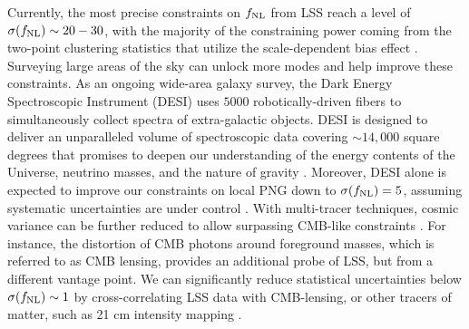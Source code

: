 Currently, the most precise constraints on $f_{\rm NL}$ from LSS reach a level of $\sigma(f_{\rm NL}) \sim 20-30$, with the majority of the constraining power coming from the two-point clustering statistics that utilize the scale-dependent bias effect \citep{2019JCAP...09..010C, mueller2022primordial, 2022PhRvD.106d3506C, 2022arXiv220111518D}. Surveying large areas of the sky can unlock more modes and help improve these constraints. As an ongoing wide-area galaxy survey, the Dark Energy Spectroscopic Instrument (DESI) uses $5000$ robotically-driven fibers to simultaneously collect spectra of extra-galactic objects. DESI is designed to deliver an unparalleled volume of spectroscopic data covering $\sim 14,000$ square degrees that promises to deepen our understanding of the energy contents of the Universe, neutrino masses, and the nature of gravity \citep{aghamousa2016desi}. Moreover, DESI alone is expected to improve our constraints on local PNG down to $\sigma(f_{\rm NL})=5$, assuming systematic uncertainties are under control \citep{aghamousa2016desi}. With multi-tracer techniques, cosmic variance can be further reduced to allow surpassing CMB-like constraints \citep{2015ApJ...814..145A}. For instance, the distortion of CMB photons around foreground masses, which is referred to as CMB lensing, provides an additional probe of LSS, but from a different vantage point. We can significantly reduce statistical uncertainties below $\sigma(f_{\rm NL})\sim 1$ by cross-correlating LSS data with CMB-lensing, or other tracers of matter, such as 21 cm intensity mapping  \citep[see, e.g.,][]{schmittfull2018PhRvD, Heinrich2022AAS...24020203H, 2023arXiv230102406J, 2023arXiv230308901S}.  
 


